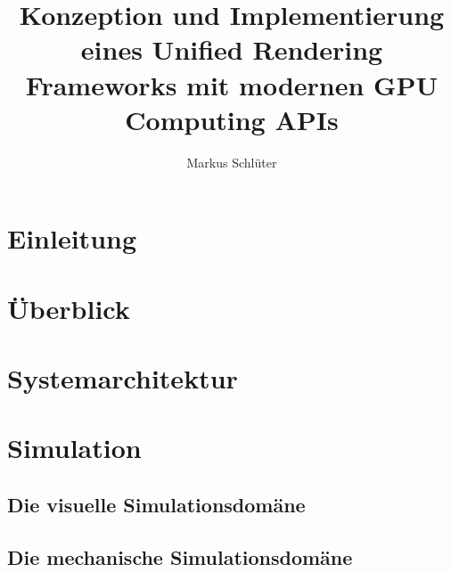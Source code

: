 \documentclass[m,twoside,intern,palatino]{cgBA}
\begin{document}
\author{Markus Schl{\"u}ter}
\title{Konzeption und Implementierung eines Unified Rendering Frameworks mit modernen GPU Computing APIs}








\maketitle
\clearpage 




\listoftodos		%
\tableofcontents
\clearpage         	%
\listoffigures   %
\listoftables
\clearpage




\section{Einleitung}
	
	
\section{Überblick}
	

\section{Systemarchitektur}
	
	
\section{Simulation}
	\label{sec:simulation}
	\subsection{Die visuelle Simulationsdomäne}
			
	\subsection{Die mechanische Simulationsdomäne}
		
\end{document}
